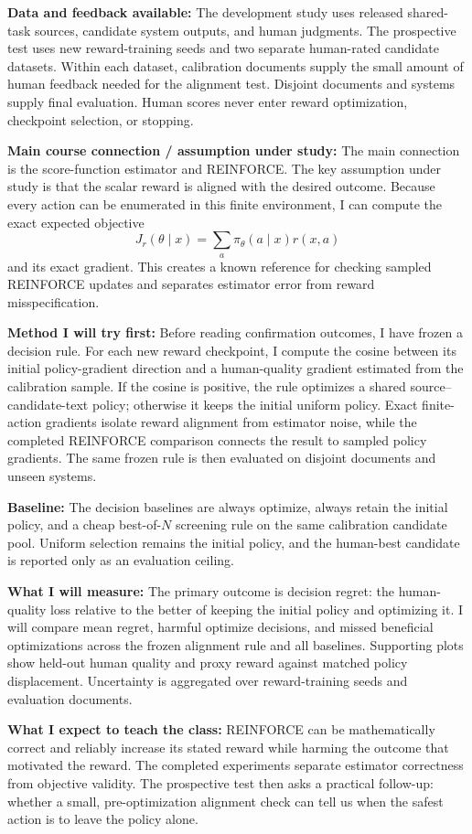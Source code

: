 \documentclass[11pt]{article}
\newcommand{\field}[1]{\vspace{0.25em}\textbf{#1}\quad}
\begin{document}
\field{Data and feedback available:}
The development study uses released shared-task sources, candidate system
outputs, and human judgments.  The prospective test uses new reward-training
seeds and two separate human-rated candidate datasets.  Within each dataset,
calibration documents supply the small amount of human feedback needed for the
alignment test.  Disjoint documents and systems supply final evaluation.  Human
scores never enter reward optimization, checkpoint selection, or stopping.

\field{Main course connection / assumption under study:}
The main connection is the score-function estimator and REINFORCE.  The key
assumption under study is that the scalar reward is aligned with the desired
outcome.  Because every action can be enumerated in this finite environment, I
can compute the exact expected objective
\[
J_r(\theta\mid x)=\sum_{a}\pi_\theta(a\mid x)r(x,a)
\]
and its exact gradient.  This creates a known reference for checking sampled
REINFORCE updates and separates estimator error from reward misspecification.

\field{Method I will try first:}
Before reading confirmation outcomes, I have frozen a decision rule.  For each
new reward checkpoint, I compute the cosine between its initial policy-gradient
direction and a human-quality gradient estimated from the calibration sample.
If the cosine is positive, the rule optimizes a shared source--candidate-text
policy; otherwise it keeps the initial uniform policy.  Exact finite-action
gradients isolate reward alignment from estimator noise, while the completed
REINFORCE comparison connects the result to sampled policy gradients.  The
same frozen rule is then evaluated on disjoint documents and unseen systems.

\field{Baseline:}
The decision baselines are always optimize, always retain the initial policy,
and a cheap best-of-$N$ screening rule on the same calibration candidate pool.
Uniform selection remains the initial policy, and the human-best candidate is
reported only as an evaluation ceiling.

\field{What I will measure:}
The primary outcome is decision regret: the human-quality loss relative to the
better of keeping the initial policy and optimizing it.  I will compare mean
regret, harmful optimize decisions, and missed beneficial optimizations across
the frozen alignment rule and all baselines.  Supporting plots show held-out
human quality and proxy reward against matched policy displacement.  Uncertainty
is aggregated over reward-training seeds and evaluation documents.

\field{What I expect to teach the class:}
REINFORCE can be mathematically correct and reliably increase its stated reward
while harming the outcome that motivated the reward.  The completed experiments
separate estimator correctness from objective validity.  The prospective test
then asks a practical follow-up: whether a small, pre-optimization alignment
check can tell us when the safest action is to leave the policy alone.
\end{document}
